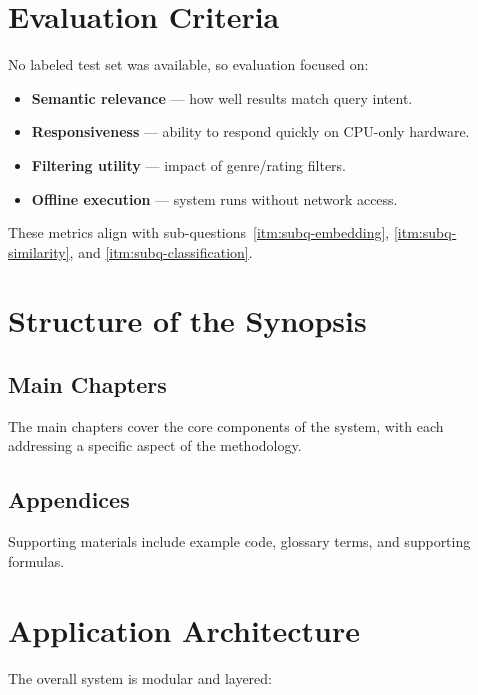 \section{Evaluation Criteria}
\label{sec:evaluation-criteria}

No labeled test set was available, so evaluation focused on:

\begin{itemize}
    \item \textbf{Semantic relevance} — how well results match query intent.
    \item \textbf{Responsiveness} — ability to respond quickly on CPU-only hardware.
    \item \textbf{Filtering utility} — impact of genre/rating filters.
    \item \textbf{Offline execution} — system runs without network access.
\end{itemize}

These metrics align with sub-questions~\ref{itm:subq-embedding}, \ref{itm:subq-similarity}, and \ref{itm:subq-classification}.

\section{Structure of the Synopsis}
\label{sec:structure-synopsis}

\subsection{Main Chapters}
The main chapters cover the core components of the system, with each addressing a specific aspect of the methodology.

\subsection{Appendices}
Supporting materials include example code, glossary terms, and supporting formulas.

\section{Application Architecture}
\label{sec:application-architecture}

The overall system is modular and layered:

